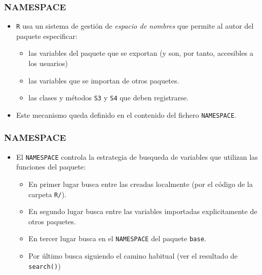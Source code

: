 \documentclass[xcolor={usenames,svgnames,dvipsnames}]{beamer}
\begin{document}
\begin{frame}
\frametitle{NAMESPACE}
\label{sec-2-3}

\begin{itemize}
\item \texttt{R} usa un sistema de gestión de \emph{espacio de nombres} que
  permite al autor del paquete especificar:
\begin{itemize}
\item las variables del paquete que se exportan (y son, por tanto,
    accesibles a los usuarios)
\item las variables que se importan de otros paquetes.
\item las clases y métodos \texttt{S3} y \texttt{S4} que deben registrarse.
\end{itemize}
\item Este mecanismo queda definido en el contenido del fichero
  \texttt{NAMESPACE}.
\end{itemize}
\end{frame}
\begin{frame}
\frametitle{NAMESPACE}
\label{sec-2-4}

\begin{itemize}
\item El \texttt{NAMESPACE} controla la estrategia de busqueda de variables
  que utilizan las funciones del paquete:
\begin{itemize}
\item En primer lugar busca entre las creadas localmente (por el código de la carpeta \texttt{R/}).
\item En segundo lugar busca entre las variables importadas
    explicitamente de otros paquetes.
\item En tercer lugar busca en el \texttt{NAMESPACE} del paquete \texttt{base}.
\item Por último busca siguiendo el camino habitual (ver el
    resultado de \texttt{search()})
\end{itemize}
\end{itemize}
\end{frame}
\end{document}
